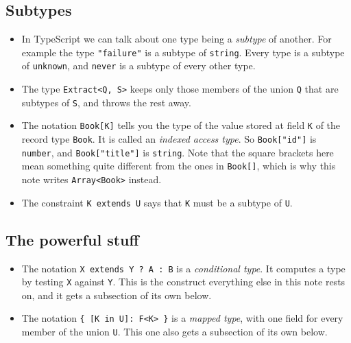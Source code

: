 \documentclass[11pt,a4paper]{article}
\begin{document}
\newpage

\subsection{Subtypes}

\begin{listbox}
\begin{itemize}\setlength{\itemsep}{2pt}

\item In TypeScript we can talk about one type being a \emph{subtype} of another. For example
      the type \texttt{"failure"} is a subtype of \texttt{string}. Every type is a subtype of
      \texttt{unknown}, and \texttt{never} is a subtype of every other type.

\item The type \texttt{Extract<Q, S>} keeps only those members of the union \texttt{Q} that are
      subtypes of \texttt{S}, and throws the rest away.

\item The notation \texttt{Book[K]} tells you the type of the value stored at field \texttt{K}
      of the record type \texttt{Book}. It is called an \emph{indexed access type}. So
      \texttt{Book["id"]} is \texttt{number}, and \texttt{Book["title"]} is \texttt{string}.
      Note that the square brackets here mean something quite different from the ones in
      \texttt{Book[]}, which is why this note writes \texttt{Array<Book>} instead.

\item The constraint \texttt{K extends U} says that \texttt{K} must be a subtype of \texttt{U}.

\end{itemize}
\end{listbox}

\subsection{The powerful stuff}

\begin{listbox}
\begin{itemize}\setlength{\itemsep}{2pt}

\item The notation \texttt{X extends Y ? A : B} is a \emph{conditional type}. It computes a type
      by testing \texttt{X} against \texttt{Y}. This is the construct everything else in this
      note rests on, and it gets a subsection of its own below.

\item The notation \texttt{\{ [K in U]: F<K> \}} is a \emph{mapped type}, with one field for
      every member of the union \texttt{U}. This one also gets a subsection of its own below.

\end{itemize}
\end{listbox}
\end{document}
